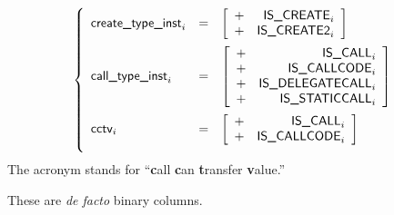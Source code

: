 \[ 
\left\{ \begin{array}{lcl}
	\isCreate_{i} & = & 
	\left[ \begin{array}{cr}
		+ & \stpCreate_{i}              \\
		+ & \stpCreateTwo_{i}           \\
	\end{array} \right] \vspace{2mm} \\
	\isCall  _{i} & = &
	\left[ \begin{array}{cr}
		+ & \stpCall_{i}                \\
		+ & \stpCallCode_{i}            \\
		+ & \stpDelegateCall_{i}        \\
		+ & \stpStaticCall_{i}          \\
	\end{array} \right] \vspace{2mm} \\
	\cctv_{i}     & = &
	\left[ \begin{array}{cr}
		+ & \stpCall_{i}                \\
		+ & \stpCallCode_{i}            \\
	\end{array} \right] \vspace{2mm} \\
\end{array} \right.
\]
\saNote{} The acronym \cctv{} stands for ``\textbf{c}all \textbf{c}an \textbf{t}ransfer \textbf{v}alue.''

\saNote{} These are \emph{de facto} binary columns.
